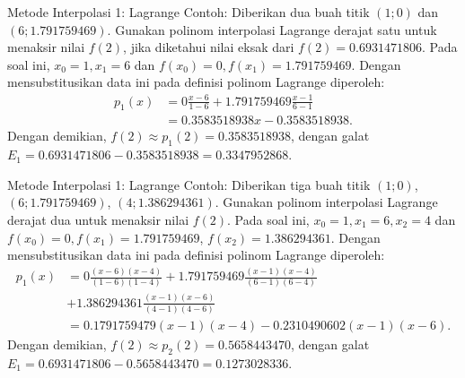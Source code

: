 \documentclass[xcolor={dvipsnames}, 9pt]{beamer}
\begin{document}
    \begin{frame}{Metode Interpolasi 1: Lagrange}
        Contoh: Diberikan dua buah titik $(1;0)$ dan $(6;1.791759469)$. Gunakan polinom interpolasi Lagrange derajat satu untuk menaksir nilai $f(2)$, jika diketahui nilai eksak dari $f(2)=0.6931471806$. \newline
        Pada soal ini, $x_0=1, x_1=6$ dan $f(x_0)=0, f(x_1)=1.791759469$. Dengan mensubstitusikan data ini pada definisi polinom Lagrange diperoleh:
        \begin{align*}
            p_1(x) &= 0\frac{x-6}{1-6} + 1.791759469\frac{x-1}{6-1} \\ &= 0.3583518938x-0.3583518938.
        \end{align*}
        Dengan demikian, $f(2)\approx p_1(2) = 0.3583518938$, dengan galat $E_1 = 0.6931471806-0.3583518938 = 0.3347952868$.
    \end{frame}
    \begin{frame}{Metode Interpolasi 1: Lagrange}
        Contoh: Diberikan tiga buah titik $(1;0)$, $(6;1.791759469)$, $(4;1.386294361)$. Gunakan polinom interpolasi Lagrange derajat dua untuk menaksir nilai $f(2)$. \newline
        Pada soal ini, $x_0=1, x_1=6, x_2=4$ dan $f(x_0)=0, f(x_1)=1.791759469$, $f(x_2) = 1.386294361$. Dengan mensubstitusikan data ini pada definisi polinom Lagrange diperoleh:
        \begin{align*}
            p_1(x) &= 0\frac{(x-6)(x-4)}{(1-6)(1-4)} + 1.791759469\frac{(x-1)(x-4)}{(6-1)(6-4)} \\ &+ 1.386294361\frac{(x-1)(x-6)}{(4-1)(4-6)} \\ &= 0.1791759479(x-1)(x-4)-0.2310490602(x-1)(x-6).
        \end{align*}
        Dengan demikian, $f(2)\approx p_2(2) = 0.5658443470$, dengan galat $E_1 = 0.6931471806-0.5658443470 = 0.1273028336$.
    \end{frame}
\end{document}
